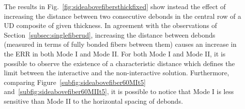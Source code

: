 \documentclass[review]{elsarticle}
\begin{document}
The results in Fig.~\ref{fig:sideabovefibersthickfixed} show instead the effect of increasing the distance between two consecutive debonds in the central row of a UD composite of given thickness. In agreement with the observations of Section~\ref{subsec:singlefiberud}, increasing the distance between debonds (measured in terms of fully bonded fibers between them) causes an increase in the ERR in both Mode I and Mode II. For both Mode I and Mode II, it is possible to observe the existence of a characteristic distance which defines the limit between the interactive and the non-interactive solution. Furthermore, comparing Figure~\ref{subfig:sideabovefiber60MIt5} and~\ref{subfig:sideabovefiber60MIIt5}, it is possible to notice that Mode I is less sensitive than Mode II to the horizontal spacing of debonds.

\end{document}
